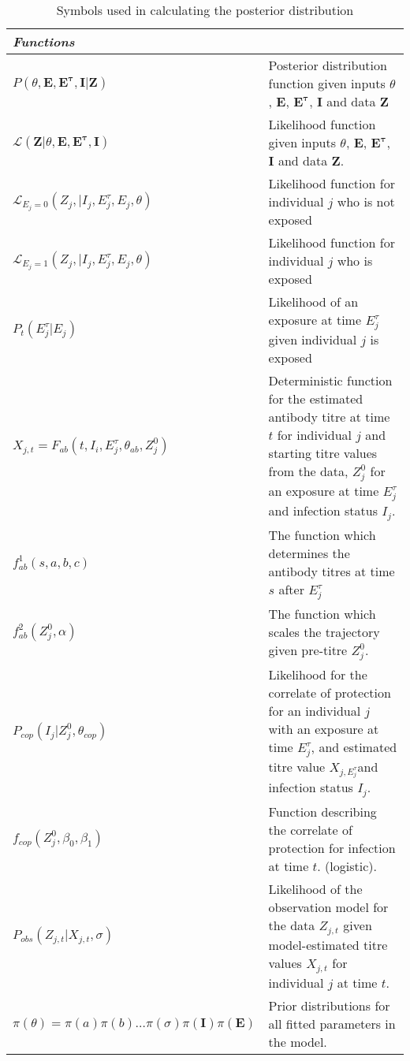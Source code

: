 \begin{table}[H]
\begin{tabular}{| l | p{} |}
       \textit{Functions} & \\
              \hline
       	$P( \theta, \mathbf{E}, \mathbf{E^\tau}, \mathbf{I}  | \mathbf{Z})$ & Posterior distribution function given inputs $\theta$, $\mathbf{E}$, $\mathbf{E^\tau}$, $\mathbf{I}$ and data $\mathbf{Z}$\\    \hline
       	$\mathcal{L}( \mathbf{Z} | \theta, \mathbf{E}, \mathbf{E^\tau}, \mathbf{I} )$ & Likelihood function given inputs $\theta$, $\mathbf{E}$, $\mathbf{E^\tau}$, $\mathbf{I}$ and data $\mathbf{Z}$. \\         \hline
        $\mathcal{L}_{E_j = 0}(Z_j, | I_j, E^\tau_j, E_j, \theta)$ & Likelihood function for individual $j$ who is not exposed \\   \hline
       	$\mathcal{L}_{E_j = 1}(Z_j, | I_j, E^\tau_j, E_j, \theta)$ & Likelihood function for individual $j$ who is exposed \\   \hline
	$P_t(E^\tau_j| E_j)$ & Likelihood of an exposure at time $E^\tau_j$ given individual $j$ is exposed  \\   \hline
	$X_{j, t} = F_{ab}( t, I_i,  E_j^\tau, \theta_{ab}, Z^0_j)$ & Deterministic function for the estimated antibody titre at time $t$ for individual $j$ and starting titre values from the data, $Z_j^0$ for an exposure at time $E_j^\tau$ and infection status $I_j$. \\   \hline
	$f^1_{ab}(s, a, b, c)$ & The function which determines the antibody titres at time $s$ after $E_j^\tau$\\  \hline 
	$f^2_{ab}(Z^0_j, \alpha)$ & The function which scales the trajectory given pre-titre $Z^0_j$. \\   \hline
	$P_{cop}(I_j | Z^0_j, \theta_{cop})$ &  Likelihood for the correlate of protection for an individual $j$ with an exposure at time $E^\tau_j$, and estimated titre value $X_{j, E^\tau_j}$and infection status $I_j$.  \\   \hline
	$f_{cop}(Z^0_j,  \beta_0, \beta_1)$ & Function describing the correlate of protection for infection at time $t$. (logistic).\\  \hline
	$P_{obs}(Z_{j, t} | X_{j, t}, \sigma)$ & Likelihood of the observation model for the data $Z_{j, t}$ given model-estimated titre values $X_{j, t}$ for individual $j$ at time $t$. \\   \hline
	$\pi(\theta) = \pi(a)\pi(b)\dots\pi(\sigma)\pi(\mathbf{I})\pi(\mathbf{E})$ & Prior distributions for all fitted parameters in the model.\\   \hline
    \end{tabular}
    \caption{Symbols used in calculating the posterior distribution}
    \label{tab:ll}
\end{table}


